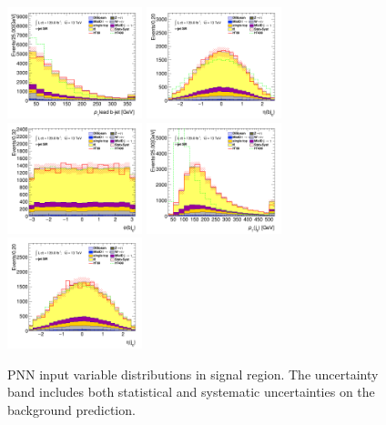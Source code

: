		\begin{figure}[!htp]
			\begin{center}    
			\includegraphics[width=0.35\textwidth]{chapters/chapter6_HPlus/images/taujets/bjet_0_pt_SR_TAUJET.png}
			\includegraphics[width=0.35\textwidth]{chapters/chapter6_HPlus/images/taujets/bjet_0_eta_SR_TAUJET.png} \\
			\includegraphics[width=0.35\textwidth]{chapters/chapter6_HPlus/images/taujets/bjet_0_phi_SR_TAUJET.png}
			\includegraphics[width=0.35\textwidth]{chapters/chapter6_HPlus/images/taujets/jet_0_pt_SR_TAUJET.png} \\
			\includegraphics[width=0.35\textwidth]{chapters/chapter6_HPlus/images/taujets/jet_0_eta_SR_TAUJET.png} 
			\end{center}
			\caption{
			PNN input variable distributions in \taujets signal region. The uncertainty band includes both statistical and systematic uncertainties on the background prediction. 
			}
			\label{fig:sr-taujets-2}
		\end{figure}

